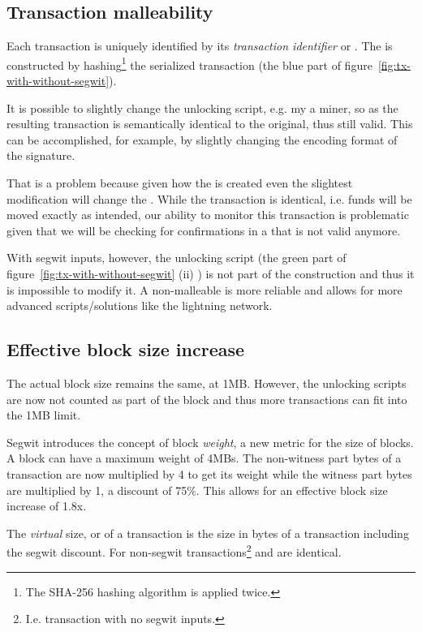\subsection*{Transaction malleability}
Each transaction is uniquely identified by its \emph{transaction identifier} or . The  is constructed by hashing\footnote{The SHA-256 hashing algorithm is applied twice.} the serialized transaction (the blue part of figure~\ref{fig:tx-with-without-segwit}).

It is possible to slightly change the unlocking script, e.g. my a miner,  so as the resulting transaction is semantically identical to the original, thus still valid. This can be accomplished, for example, by slightly changing the encoding format of the signature.

That is a problem because given how the  is created even the slightest modification will change the . While the transaction is identical, i.e. funds will be moved exactly as intended, our ability to monitor this transaction is problematic given that we will be checking for confirmations in a  that is not valid anymore.

With segwit inputs, however, the unlocking script (the green part of figure~\ref{fig:tx-with-without-segwit} (ii) ) is not part of the  construction and thus it is impossible to modify it. A non-malleable  is more reliable and allows for more advanced scripts/solutions like the lightning network.


\subsection*{Effective block size increase}
The actual block size remains the same, at 1MB. However, the unlocking scripts are now not counted as part of the block and thus more transactions can fit into the 1MB limit.

Segwit introduces the concept of block \emph{weight}, a new metric for the size of blocks. A block can have a maximum weight of 4MBs. The non-witness part bytes of a transaction are now multiplied by 4 to get its weight while the witness part bytes are multiplied by 1, a discount of 75\%. This allows for an effective block size increase of 1.8x.

The \emph{virtual} size, or  of a transaction is the size in bytes of a transaction including the segwit discount. For non-segwit transactions\footnote{I.e. transaction with no segwit inputs.}  and  are identical.



